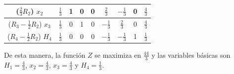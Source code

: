 \documentclass[fleqn, 12pt]{article}
\begin{document}
\begin{enumerate}
\begin{center}
\begin{tabular}{|c|c|c|c|c|c|c|c|c|}
				\hline
				($\frac{2}{3} R_2$) $ x_2 $           & $ \frac{1}{3} $	   & 1       & 0        & 0       & $ \frac{2}{3} $       & $ -\frac{1}{3} $      & 0       & $ \frac{4}{3} $ \\
				\hline
				($R_3 - \frac{1}{2} R_2$) $ x_3 $           & $ \frac{1}{3} $	   & 0       & 1        & 0       & $ -\frac{1}{3} $      & $ \frac{2}{3} $       & 0       & $ \frac{4}{3} $ \\
				\hline
				($R_4 - \frac{1}{2} R_2$) $ H_4 $ & $ \frac{1}{3} $       & 0       & 0        & 0       & $ -\frac{1}{3} $       & $ -\frac{1}{3} $      & 1       & $ \frac{1}{3} $ \\
				\hline
			\end{tabular}
		\end{center}

		De esta manera, la función $Z$ se maximiza en $ \frac{44}{3} $ y las variables básicas son $ H_1 = \frac{4}{3} $, $ x_2 = \frac{4}{3} $, $ x_3 = \frac{4}{3} $ y $ H_4 = \frac{1}{3} $.
	\end{enumerate}
\end{document}

